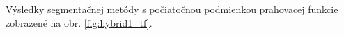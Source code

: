 \documentclass[a4paper,11pt,oneside]{article}%
\begin{document}
Výsledky segmentačnej metódy s počiatočnou podmienkou prahovacej funkcie zobrazené na obr. \ref{fig:hybrid1_tf}.

\begin{figure}[H]  
    \hspace{5px}

\end{figure}
\end{document}
